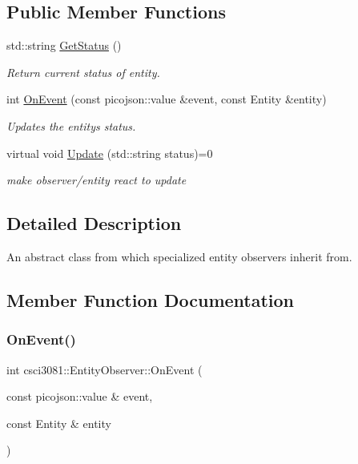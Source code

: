 \subsection*{Public Member Functions}
\begin{DoxyCompactItemize}
\item 
\mbox{\label{classcsci3081_1_1EntityObserver_a7585beb5fe2288721f2e6d6a801cde69}} 
std\+::string \hyperlink{classcsci3081_1_1EntityObserver_a7585beb5fe2288721f2e6d6a801cde69}{Get\+Status} ()
\begin{DoxyCompactList}\small\item\em Return current status of entity. \end{DoxyCompactList}\item 
int \hyperlink{classcsci3081_1_1EntityObserver_a5f972497c62a6eb6581e32fa21afbc2f}{On\+Event} (const picojson\+::value \&event, const Entity \&entity)
\begin{DoxyCompactList}\small\item\em Updates the entity\textquotesingle{}s status. \end{DoxyCompactList}\item 
virtual void \hyperlink{classcsci3081_1_1EntityObserver_ad3188f03b6e68961ffcc415526795867}{Update} (std\+::string status)=0
\begin{DoxyCompactList}\small\item\em make observer/entity react to update \end{DoxyCompactList}\end{DoxyCompactItemize}


\subsection{Detailed Description}
An abstract class from which specialized entity observers inherit from. 

\subsection{Member Function Documentation}
\mbox{\label{classcsci3081_1_1EntityObserver_a5f972497c62a6eb6581e32fa21afbc2f}} 
\subsubsection{\texorpdfstring{On\+Event()}{OnEvent()}}
{\footnotesize\ttfamily int csci3081\+::\+Entity\+Observer\+::\+On\+Event (\begin{DoxyParamCaption}\item[{const picojson\+::value \&}]{event,  }\item[{const Entity \&}]{entity }\end{DoxyParamCaption})\hspace{0.3cm}{\ttfamily [inline]}}



